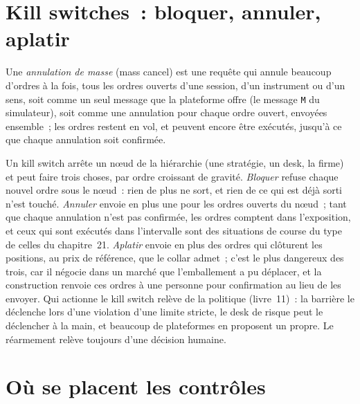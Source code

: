 \section{Kill switches~: bloquer, annuler, aplatir}

\begin{definition}\label{def:ll:pre-trade-risk-and-kill-switches:mass}
Une \emph{annulation de masse} (mass cancel) est une requête qui annule beaucoup d'ordres à la fois, tous les ordres ouverts d'une session,
d'un instrument ou d'un sens, soit comme un seul message que la plateforme offre (le message \texttt{M} du simulateur), soit comme une annulation pour chaque
ordre ouvert, envoyées ensemble~; les ordres restent en vol, et peuvent encore être exécutés, jusqu'à ce que chaque annulation soit confirmée.
\end{definition}

Un kill switch arrête un nœud de la hiérarchie (une stratégie, un desk, la firme) et peut faire trois choses, par ordre croissant de gravité.
\emph{Bloquer} refuse chaque nouvel ordre sous le nœud~: rien de plus ne sort, et rien de ce qui est déjà sorti n'est touché.
\emph{Annuler} envoie en plus une  pour les ordres ouverts du nœud~; tant que chaque annulation n'est pas confirmée, les ordres comptent dans
l'exposition, et ceux qui sont exécutés dans l'intervalle sont des situations de course du type de celles du chapitre~21. \emph{Aplatir} envoie en plus des ordres qui
clôturent les positions, au prix de référence, que le collar admet~; c'est le plus dangereux des trois, car il négocie
dans un marché que l'emballement a pu déplacer, et la construction renvoie ces ordres à une personne pour confirmation au lieu de les envoyer.
Qui actionne le kill switch relève de la politique (livre~11)~: la barrière le déclenche lors d'une violation d'une limite stricte, le desk de risque peut
le déclencher à la main, et beaucoup de plateformes en proposent un propre. Le réarmement relève toujours d'une décision humaine.

\label{lst:ll:pre-trade-risk-and-kill-switches:kill}

\section{Où se placent les contrôles}

